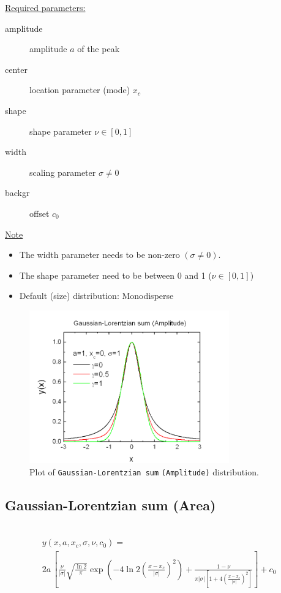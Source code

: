 \vspace{5mm}

\underline{Required parameters:}
\begin{description}
    \item[amplitude] amplitude $a$ of the peak
    \item[center] location parameter (mode) $x_c$
    \item[shape] shape parameter $\nu\in [0,1]$
    \item[width] scaling parameter $\sigma \neq 0$
    \item[backgr] offset $c_0$
\end{description}

\underline{Note}
\begin{itemize}
  \item The width parameter needs to be non-zero $(\sigma\neq 0)$.
  \item The shape parameter need to be between 0 and 1 ($\nu\in [0,1]$)
  \item Default (size) distribution: Monodisperse
\end{itemize}
\begin{figure}[htb]
\begin{center}
\includegraphics[width=0.768\textwidth]{GaussianLorentzianSumAmplitude.png}
\end{center}
\caption{Plot of \texttt{Gaussian-Lorentzian sum} \texttt{(Amplitude)} distribution.}
\label{fig:GaussianLorentzianSumAmplitude}
\end{figure}

\clearpage

\subsection{Gaussian-Lorentzian sum (Area)} ~\\
\label{sec:GaussianLorentzianSumArea}
\begin{multline}
y(x,a,x_c,\sigma,\nu,c_0) = \\
2a\,\left[\frac{\nu}{|\sigma|}\sqrt{\frac{\ln 2}{\pi}}\exp\left({
-4\ln
2\left(\frac{x-x_c}{|\sigma|}\right)^2}\right)+\frac{1-\nu}{\pi|\sigma|\left[1+4\left(\frac{x-x_c}{|\sigma|}\right)^2\right]}\right]+c_0
\end{multline}
\vspace{5mm}

